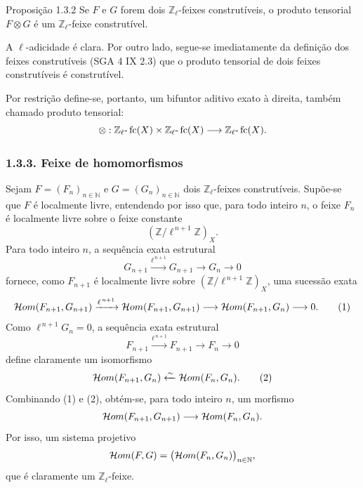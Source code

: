 \begin{statement}{Proposição 1.3.2}
Se \(F\) e \(G\) forem dois \(\mathbb Z_\ell\)-feixes construtíveis, o produto tensorial \(F\otimes G\) é um \(\mathbb Z_\ell\)-feixe construtível.
\end{statement}

\begin{prooftext}[Demonstração]
A \(\ell\)-adicidade é clara. Por outro lado, segue-se imediatamente da definição dos feixes construtíveis (SGA 4 IX 2.3) que o produto tensorial de dois feixes construtíveis é construtível.
\end{prooftext}

Por restrição define-se, portanto, um bifuntor aditivo exato à direita, também chamado produto tensorial:
\[
\otimes:\mathbb Z_\ell\text{-}\operatorname{fc}(X)\times \mathbb Z_\ell\text{-}\operatorname{fc}(X)
\longrightarrow \mathbb Z_\ell\text{-}\operatorname{fc}(X).
\]

\subsubsection*{1.3.3. Feixe de homomorfismos}

Sejam \(F=(F_n)_{n\in\mathbb N}\) e \(G=(G_n)_{n\in\mathbb N}\) dois \(\mathbb Z_\ell\)-feixes construtíveis. Supõe-se que \(F\) é localmente livre, entendendo por isso que, para todo inteiro \(n\), o feixe \(F_n\) é localmente livre sobre o feixe constante
\[
(\mathbb Z/\ell^{\,n+1}\mathbb Z)_X.
\]
Para todo inteiro \(n\), a sequência exata estrutural
\[
G_{n+1}\xrightarrow{\ell^{\,n+1}}G_{n+1}\longrightarrow G_n\longrightarrow 0
\]
fornece, como \(F_{n+1}\) é localmente livre sobre \((\mathbb Z/\ell^{\,n+1}\mathbb Z)_X\), uma sucessão exata
\[
\mathcal{H}om(F_{n+1},G_{n+1})
 \xrightarrow{\ell^{\,n+1}}
\mathcal{H}om(F_{n+1},G_{n+1})
 \longrightarrow
\mathcal{H}om(F_{n+1},G_n)
 \longrightarrow 0.
\tag{1}
\]
Como \(\ell^{\,n+1}G_n=0\), a sequência exata estrutural
\[
F_{n+1}\xrightarrow{\ell^{\,n+1}}F_{n+1}\longrightarrow F_n\longrightarrow 0
\]
define claramente um isomorfismo
\[
\mathcal{H}om(F_{n+1},G_n)\xleftarrow{\sim}\mathcal{H}om(F_n,G_n).
\tag{2}
\]
Combinando (1) e (2), obtém-se, para todo inteiro \(n\), um morfismo
\[
\mathcal{H}om(F_{n+1},G_{n+1})\longrightarrow \mathcal{H}om(F_n,G_n).
\]
Por isso, um sistema projetivo
\[
\mathcal{H}om(F,G)=\bigl(\mathcal{H}om(F_n,G_n)\bigr)_{n\in\mathbb N},
\]
que é claramente um \(\mathbb Z_\ell\)-feixe.
